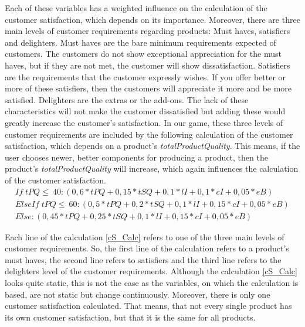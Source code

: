 Each of these variables has a weighted influence on the calculation of the customer satisfaction, which depends on its importance.
Moreover, there are three main levels of customer requirements regarding products: Must haves, satisfiers and delighters. \cite{krienke_messung_2009}
Must haves are the bare minimum requirements expected of customers. The customers do not show exceptional appreciation for the must haves, but if they are not met, the customer will show dissatisfaction. Satisfiers are the requirements that the customer expressly wishes. If you offer better or more of these satisfiers, then the customers will appreciate it more and be more satisfied. Delighters are the extras or the add-ons. The lack of these characteristics will not make the customer dissatisfied but adding these would greatly increase the customer's satisfaction. In our game, these three levels of customer requirements are included by the following calculation of the customer satisfaction, which depends on a product's \textit{totalProductQuality}. This means, if the user chooses newer, better components for producing a product, then the product's \textit{totalProductQuality} will increase, which again influences the calculation of the customer satisfaction.
    \begin{equation}
    \label{cS_Calc}
    \begin{aligned}
    If \; tPQ \leq \ 40: (0,6*tPQ + 0,15*tSQ + 0,1*lI + 0,1*cI + 0,05*eB)\\
    ElseIf \; tPQ \leq \ 60: (0,5*tPQ + 0,2*tSQ + 0,1*lI + 0,15*cI + 0,05*eB)\\
    Else: (0,45*tPQ + 0,25*tSQ + 0,1*lI + 0,15*cI + 0,05*eB)
    \end{aligned}
    \end{equation}

Each line of the calculation \ref{cS_Calc} refers to one of the three main levels of customer requirements. So, the first line of the calculation refers to a product's must haves, the second line refers to satisfiers and the third line refers to the delighters level of the customer requirements.
Although the calculation \ref{cS_Calc} looks quite static, this is not the case as the variables, on which the calculation is based, are not static but change continuously. Moreover, there is only one customer satisfaction calculated. That means, that not every single product has its own customer satisfaction, but that it is the same for all products.
    
